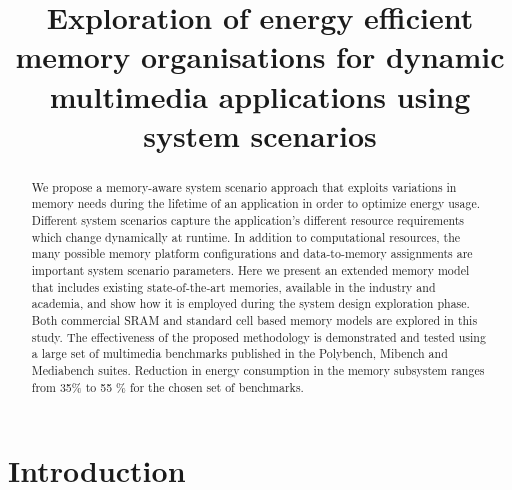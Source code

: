 \documentclass[a4paper,conference]{IEEEtran}
\begin{document}
\title{Exploration of energy efficient memory organisations for dynamic multimedia applications using system scenarios}

\author{
}

\maketitle

\begin{abstract}
We propose a memory-aware system scenario approach that exploits variations in memory needs during the lifetime of an application in order to optimize energy usage. Different system scenarios capture the application's different resource requirements which change dynamically at runtime. In addition to computational resources, the many possible memory platform configurations and data-to-memory assignments are important system scenario parameters. Here we present an extended memory model that includes existing state-of-the-art memories, available in the industry and academia, and show how it is employed during the system design exploration phase. Both commercial SRAM and standard cell based memory models are explored in this study. The effectiveness of the proposed methodology is demonstrated and tested using a large set of multimedia benchmarks published in the Polybench, Mibench and Mediabench suites. Reduction in energy consumption in the memory subsystem ranges from 35\% to 55 \% for the chosen set of benchmarks.
\end{abstract}
\IEEEpeerreviewmaketitle


\section{Introduction}
\label{sec:introduction}
\end{document}
